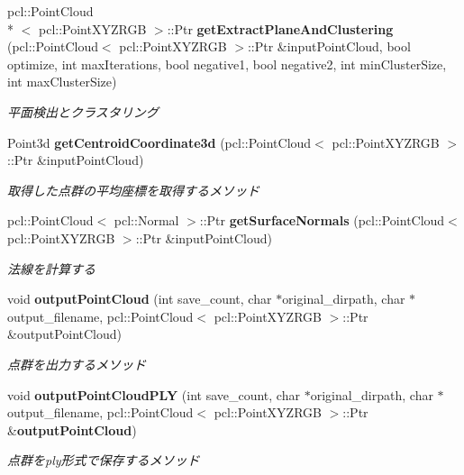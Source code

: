 \begin{DoxyCompactItemize}
pcl\-::\-Point\-Cloud\\*
$<$ pcl\-::\-Point\-X\-Y\-Z\-R\-G\-B $>$\-::Ptr {\bf get\-Extract\-Plane\-And\-Clustering} (pcl\-::\-Point\-Cloud$<$ pcl\-::\-Point\-X\-Y\-Z\-R\-G\-B $>$\-::Ptr \&input\-Point\-Cloud, bool optimize, int max\-Iterations, bool negative1, bool negative2, int min\-Cluster\-Size, int max\-Cluster\-Size)
\begin{DoxyCompactList}\small\item\em 平面検出とクラスタリング \end{DoxyCompactList}\item 
Point3d {\bf get\-Centroid\-Coordinate3d} (pcl\-::\-Point\-Cloud$<$ pcl\-::\-Point\-X\-Y\-Z\-R\-G\-B $>$\-::Ptr \&input\-Point\-Cloud)
\begin{DoxyCompactList}\small\item\em 取得した点群の平均座標を取得するメソッド \end{DoxyCompactList}\item 
pcl\-::\-Point\-Cloud$<$ pcl\-::\-Normal $>$\-::Ptr {\bf get\-Surface\-Normals} (pcl\-::\-Point\-Cloud$<$ pcl\-::\-Point\-X\-Y\-Z\-R\-G\-B $>$\-::Ptr \&input\-Point\-Cloud)
\begin{DoxyCompactList}\small\item\em 法線を計算する \end{DoxyCompactList}\item 
void {\bf output\-Point\-Cloud} (int save\-\_\-count, char $\ast$original\-\_\-dirpath, char $\ast$output\-\_\-filename, pcl\-::\-Point\-Cloud$<$ pcl\-::\-Point\-X\-Y\-Z\-R\-G\-B $>$\-::Ptr \&output\-Point\-Cloud)
\begin{DoxyCompactList}\small\item\em 点群を出力するメソッド \end{DoxyCompactList}\item 
void {\bf output\-Point\-Cloud\-P\-L\-Y} (int save\-\_\-count, char $\ast$original\-\_\-dirpath, char $\ast$output\-\_\-filename, pcl\-::\-Point\-Cloud$<$ pcl\-::\-Point\-X\-Y\-Z\-R\-G\-B $>$\-::Ptr \&{\bf output\-Point\-Cloud})
\begin{DoxyCompactList}\small\item\em 点群をply形式で保存するメソッド \end{DoxyCompactList}\end{DoxyCompactItemize}
